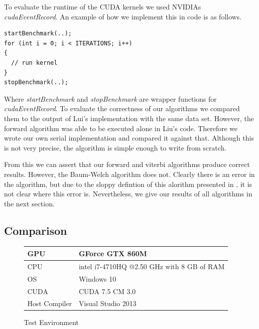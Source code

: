 \documentclass[english, paper=a4]{scrartcl}
\begin{document}
To evaluate the runtime of the CUDA kernels we used NVIDIAs \textit{cudaEventRecord}. An example of how we implement this in code is as follows.

\begin{verbatim}
startBenchmark(..);
for (int i = 0; i < ITERATIONS; i++)
{
  // run kernel
}
stopBenchmark(..);
\end{verbatim}

Where \textit{startBenchmark} and \textit{stopBenchmark} are wrapper functions for \textit{cudaEventRecord}.
To evaluate the correctness of our algorithms we compared them to the output of Lui's implementation with the same data set. However, the forward algorithm was able to be executed alone in Liu's code. Therefore we wrote our own serial implementation and compared it against that. Although this is not very precise, the algorithm is simple enough to write from scratch.

From this we can assert that our forward and viterbi algorithms produce correct results. However, the Baum-Welch algorithm does not. Clearly there is an error in the algorithm, but due to the sloppy defintion of this alorithm presented in \cite{cuhmm}, it is not clear where this error is. Nevertheless, we give our results of all algorithms in the next section.

\subsection{Comparison}

\begin{figure}[H]
\centering
\begin{tabular}{|l|l|}
\hline
GPU &GForce GTX 860M \\ \hline
CPU & intel i7-4710HQ @2.50 GHz with 8 GB of RAM  \\ \hline
OS & Windows 10 \\ \hline
CUDA & CUDA 7.5 CM 3.0 \\ \hline
Host Compiler & Visual Studio 2013 \\ \hline

\end{tabular}

\caption{Test Environment}
\end{figure}
\end{document}
